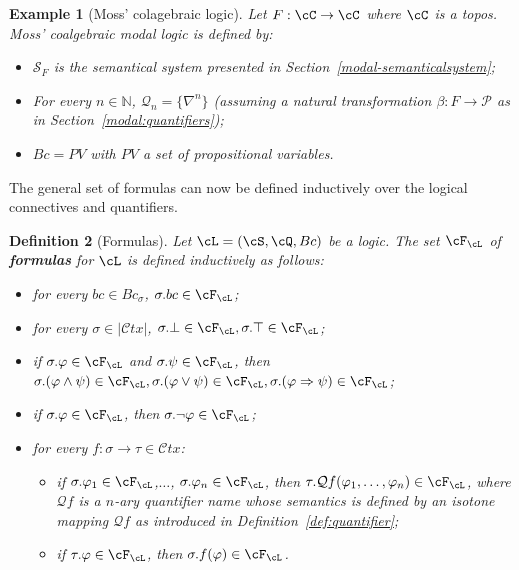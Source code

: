 \documentclass[preprint,3p,times]{elsarticle}
\newtheorem{definition}{Definition}[section]
\newtheorem{example}[definition]{Example}
\newcommand{\Ctx}{\mathcal{C}tx}
\newcommand{\Qf}{\mathcal{Q}f}
\begin{document}
\begin{example}[Moss' colagebraic logic]
Let $F : \cC \to \cC$ where $\cC$ is a topos. Moss' coalgebraic modal logic is defined by:
\begin{itemize}
    \item $\mathcal{S}_F$ is the semantical system presented in Section~\ref{modal-semanticalsystem};
    \item For every $n \in \mathbb{N}$, $\mathcal{Q}_n = \{\nabla^n\}$ (assuming a natural transformation $\beta : F \to \mathcal{P}$ as in Section~\ref{modal:quantifiers});
    \item $Bc = PV$ with $PV$ a set of propositional variables.
\end{itemize}
\end{example}

The general set of formulas can now be defined inductively over the logical connectives and quantifiers.

\begin{definition}[Formulas]
\label{def:formulas}
Let $\cL = (\cS,\cQ,Bc)$ be a logic. The set $\cF_\cL$ of {\bf formulas} for \(\cL\) is defined inductively as follows:

\begin{itemize}
	\item for every $bc \in Bc_\sigma$, $\sigma.bc \in \cF_\cL$;
	\item for every $\sigma \in |\Ctx|$, $\sigma.\bot \in \cF_\cL,\sigma.\top \in \cF_\cL$;
	\item if $\sigma.\varphi \in \cF_\cL$ and $\sigma.\psi \in \cF_\cL$, then $\sigma.(\varphi \wedge \psi) \in \cF_\cL, \sigma.(\varphi \vee \psi) \in \cF_\cL, \sigma.(\varphi \Rightarrow \psi) \in \cF_\cL$; 
	\item if $\sigma.\varphi \in \cF_\cL$, then $\sigma.\neg \varphi \in \cF_\cL$;
	\item for every $f : \sigma \to \tau \in \Ctx$:
		\begin{itemize}
			\item if $\sigma.\varphi_1 \in \cF_\cL$,$\ldots$, $\sigma.\varphi_n \in \cF_\cL$, then $\tau.\Qf (\varphi_1,\ldots,\varphi_n) \in \cF_\cL$, where $\Qf$ is a $n$-ary quantifier name whose semantics is defined by an isotone mapping $\Qf$ as introduced in Definition~\ref{def:quantifier};
			\item if $\tau.\varphi \in \cF_\cL$, then $\sigma.f(\varphi) \in \cF_\cL$.
		\end{itemize}
\end{itemize}
\end{definition}
\end{document}
